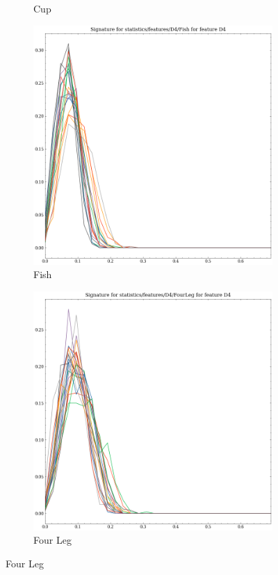 \begin{figure}[t!p]
\begin{subfigure}[b]{0.23\textwidth}
        \caption{Cup}
    \end{subfigure}
    \hfill
    \begin{subfigure}[b]{0.23\textwidth}
        \includegraphics[width=\textwidth]{assets/feature_extraction/D4/Fish.png}
        \caption{Fish}
    \end{subfigure}
    \hfill
    \begin{subfigure}[b]{0.23\textwidth}
        \includegraphics[width=\textwidth]{assets/feature_extraction/D4/FourLeg.png}
        \caption{Four Leg}
    \end{subfigure}
    \hfill


\end{figure}
